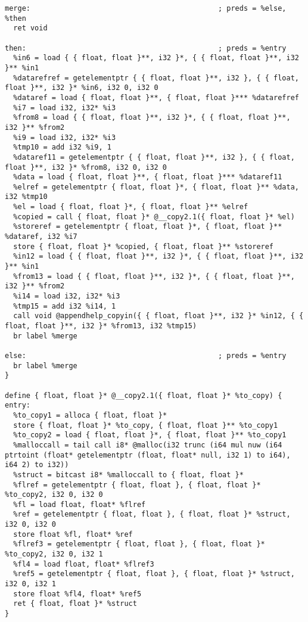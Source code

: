 \documentclass[main.tex]{subfiles}
\begin{document}
{\begin{lstlisting}
merge:                                            ; preds = %else, %then
  ret void

then:                                             ; preds = %entry
  %in6 = load { { float, float }**, i32 }*, { { float, float }**, i32 }** %in1
  %datarefref = getelementptr { { float, float }**, i32 }, { { float, float }**, i32 }* %in6, i32 0, i32 0
  %dataref = load { float, float }**, { float, float }*** %datarefref
  %i7 = load i32, i32* %i3
  %from8 = load { { float, float }**, i32 }*, { { float, float }**, i32 }** %from2
  %i9 = load i32, i32* %i3
  %tmp10 = add i32 %i9, 1
  %dataref11 = getelementptr { { float, float }**, i32 }, { { float, float }**, i32 }* %from8, i32 0, i32 0
  %data = load { float, float }**, { float, float }*** %dataref11
  %elref = getelementptr { float, float }*, { float, float }** %data, i32 %tmp10
  %el = load { float, float }*, { float, float }** %elref
  %copied = call { float, float }* @__copy2.1({ float, float }* %el)
  %storeref = getelementptr { float, float }*, { float, float }** %dataref, i32 %i7
  store { float, float }* %copied, { float, float }** %storeref
  %in12 = load { { float, float }**, i32 }*, { { float, float }**, i32 }** %in1
  %from13 = load { { float, float }**, i32 }*, { { float, float }**, i32 }** %from2
  %i14 = load i32, i32* %i3
  %tmp15 = add i32 %i14, 1
  call void @appendhelp_copyin({ { float, float }**, i32 }* %in12, { { float, float }**, i32 }* %from13, i32 %tmp15)
  br label %merge

else:                                             ; preds = %entry
  br label %merge
}

define { float, float }* @__copy2.1({ float, float }* %to_copy) {
entry:
  %to_copy1 = alloca { float, float }*
  store { float, float }* %to_copy, { float, float }** %to_copy1
  %to_copy2 = load { float, float }*, { float, float }** %to_copy1
  %malloccall = tail call i8* @malloc(i32 trunc (i64 mul nuw (i64 ptrtoint (float* getelementptr (float, float* null, i32 1) to i64), i64 2) to i32))
  %struct = bitcast i8* %malloccall to { float, float }*
  %flref = getelementptr { float, float }, { float, float }* %to_copy2, i32 0, i32 0
  %fl = load float, float* %flref
  %ref = getelementptr { float, float }, { float, float }* %struct, i32 0, i32 0
  store float %fl, float* %ref
  %flref3 = getelementptr { float, float }, { float, float }* %to_copy2, i32 0, i32 1
  %fl4 = load float, float* %flref3
  %ref5 = getelementptr { float, float }, { float, float }* %struct, i32 0, i32 1
  store float %fl4, float* %ref5
  ret { float, float }* %struct
}


\end{lstlisting}}
\end{document}
